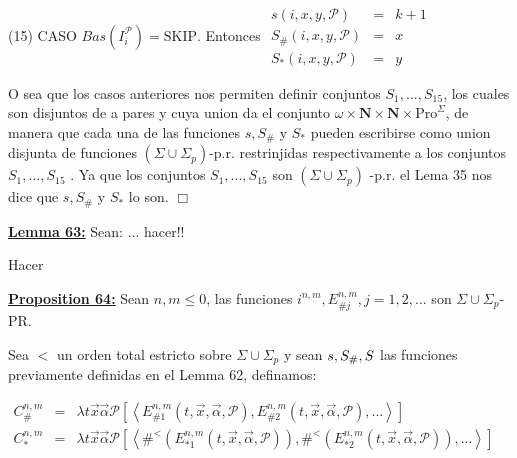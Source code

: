 (15) CASO \(Bas(I_{i}^{\mathcal{P}})=\mathrm{SKIP}\). Entonces
\(\displaystyle \begin{array}{rcl} s(i,x,y,\mathcal{P}) & =& k+1 \\ S_{\#}(i,x,y,\mathcal{P}) & =& x \\ S_{\ast }(i,x,y,\mathcal{P}) & =& y \end{array} \)

O sea que los casos anteriores nos permiten definir conjuntos \( S_{1},...,S_{15}\), los cuales son disjuntos de a pares y cuya union da el conjunto \(\omega \times \mathbf{N}\times \mathbf{N}\times \mathrm{Pro} ^{\Sigma }\), de manera que cada una de las funciones \(s,S_{\#}\) y \(S_{\ast }\) pueden escribirse como union disjunta de funciones \((\Sigma \cup \Sigma _{p}) \)-p.r. restrinjidas respectivamente a los conjuntos \(S_{1},...,S_{15}\) . Ya que los conjuntos \(S_{1},...,S_{15}\) son \((\Sigma \cup \Sigma _{p})\) -p.r. el Lema 35 nos dice que \(s,S_{\#}\) y \(S_{\ast }\) lo son. \(\Box\)


\textbf{\underline{Lemma 63:}} Sean: ... hacer!!

\PROOF Hacer

\textbf{\underline{Proposition 64:}} Sean $n, m \leq 0$, las funciones $i^{n, m}, E_{\#j}^{n, m}, j = 1, 2, ...$ son
  $\Sigma \cup \Sigma_{p}$-PR.

\PROOF Sea $<$ un orden total estricto sobre $\Sigma \cup \Sigma_{p}$ y sean $s, S_{\#}, S_{\*}$ las funciones previamente definidas en el Lemma 62, definamos:

\(\displaystyle \begin{array}{rcl} C_{\#}^{n,m} & =& \lambda t\vec{x}\vec{\alpha}\mathcal{P}\left[ \left\langle E_{\#1}^{n,m}(t,\vec{x},\vec{\alpha},\mathcal{P}),E_{\#2}^{n,m}(t,\vec{x}, \vec{\alpha},\mathcal{P}),...\right\rangle \right] \\ C_{\ast }^{n,m} & =& \lambda t\vec{x}\vec{\alpha}\mathcal{P}\left[ \left\langle \#^{< }(E_{\ast 1}^{n,m}(t,\vec{x},\vec{\alpha},\mathcal{P} )),\#^{< }(E_{\ast 2}^{n,m}(t,\vec{x},\vec{\alpha},\mathcal{P} )),...\right\rangle \right] \end{array} \)

